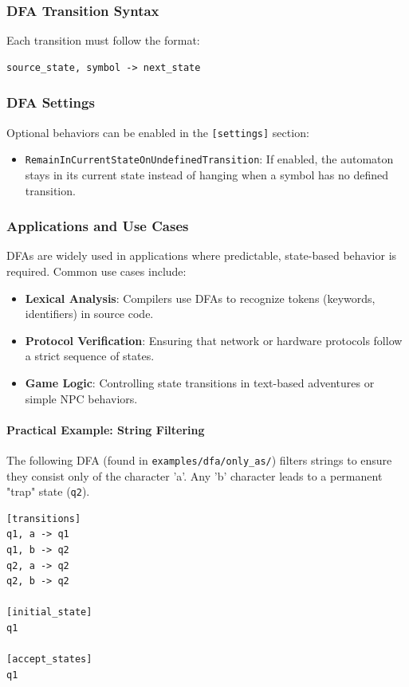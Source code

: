 \documentclass{article}
\begin{document}
\subsubsection{DFA Transition Syntax}
Each transition must follow the format:
\begin{lstlisting}
source_state, symbol -> next_state
\end{lstlisting}

\subsubsection{DFA Settings}
Optional behaviors can be enabled in the \texttt{[settings]} section:
\begin{itemize}
    \item \texttt{RemainInCurrentStateOnUndefinedTransition}: If enabled, the automaton stays in its current state instead of hanging when a symbol has no defined transition.
\end{itemize}

\subsubsection{Applications and Use Cases}
DFAs are widely used in applications where predictable, state-based behavior is required. Common use cases include:
\begin{itemize}
    \item \textbf{Lexical Analysis}: Compilers use DFAs to recognize tokens (keywords, identifiers) in source code.
    \item \textbf{Protocol Verification}: Ensuring that network or hardware protocols follow a strict sequence of states.
    \item \textbf{Game Logic}: Controlling state transitions in text-based adventures or simple NPC behaviors.
\end{itemize}

\paragraph{Practical Example: String Filtering}
The following DFA (found in \texttt{examples/dfa/only\_as/}) filters strings to ensure they consist only of the character 'a'. Any 'b' character leads to a permanent "trap" state (\texttt{q2}).
\begin{lstlisting}[caption=DFA for matching only 'a's]
[transitions]
q1, a -> q1
q1, b -> q2
q2, a -> q2
q2, b -> q2

[initial_state]
q1

[accept_states]
q1
\end{lstlisting}
\end{document}
